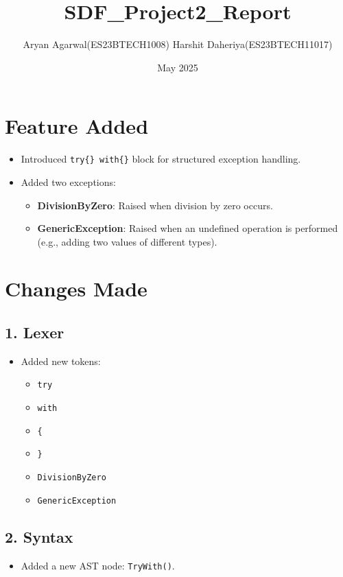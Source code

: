 \documentclass{article}
\title{SDF\_Project2\_Report}
\author{ Aryan Agarwal(ES23BTECH1008) Harshit Daheriya(ES23BTECH11017)}
\date{May 2025}
\begin{document}
\maketitle

\section*{Feature Added}
\begin{itemize}
    \item Introduced \texttt{try\{\} with\{\}} block for structured exception handling.
    \item Added two exceptions:
    \begin{itemize}
        \item \textbf{DivisionByZero}: Raised when division by zero occurs.
        \item \textbf{GenericException}: Raised when an undefined operation is performed (e.g., adding two values of different types).
    \end{itemize}
\end{itemize}

\section*{Changes Made}

\subsection*{1. Lexer}
\begin{itemize}
    \item Added new tokens:
    \begin{itemize}
        \item \texttt{try}
        \item \texttt{with}
        \item \texttt{\{}
        \item \texttt{\}}
        \item \texttt{DivisionByZero}
        \item \texttt{GenericException}
    \end{itemize}
\end{itemize}

\subsection*{2. Syntax}
\begin{itemize}
    \item Added a new AST node: \texttt{TryWith()}.
\end{itemize}
\end{document}
